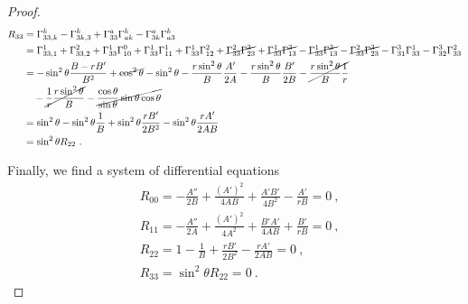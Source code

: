 \begin{proof}
        \begin{equation*}
        \begin{aligned}
            R_{33} & = \Gamma^k_{33,k} - \Gamma^k_{3k,3} + \Gamma^a_{33} \Gamma^k_{ak} - \Gamma^a_{3k} \Gamma^k_{a3} \\ & =\Gamma^1_{33,1} + \Gamma^2_{33,2} + \Gamma^1_{33} \Gamma^0_{10} + \Gamma^1_{33} \Gamma^1_{11} + \Gamma^1_{33} \Gamma^2_{12} + \cancel{\Gamma^2_{33} \Gamma^3_{23}} + \cancel{\Gamma^1_{33} \Gamma^3_{13}} - \cancel{\Gamma^1_{33} \Gamma^3_{13} } - \cancel{\Gamma^2_{33} \Gamma^3_{23}} - \Gamma^3_{31} \Gamma^1_{33} - \Gamma^3_{32} \Gamma^2_{33} \\ & = - \sin^2 \theta \frac{B-rB'}{B^2} + \cancel{\cos^2 \theta} - \sin^2 \theta - \frac{r \sin^2 \theta}{B} \frac{A'}{2A} - \frac{r \sin^2 \theta}{B} \frac{B'}{2B} - \cancel{\frac{r \sin^2 \theta}{B} \frac{1}{r}} \\ & \quad - \cancel{\frac{1}{r} \frac{r \sin^2 \theta}{B}} - \cancel{\frac{\cos \theta}{\sin \theta} \sin \theta \cos \theta} \\ & = \sin^2 \theta - \sin^2 \theta \frac{1}{B} + \sin^2 \theta \frac{rB'}{2B^2} - \sin^2 \theta \frac{rA'}{2AB} \\ & = \sin^2 \theta R_{22} ~.
        \end{aligned}
        \end{equation*}

        Finally, we find a system of differential equations 
        \begin{equation*}
        \begin{aligned}
            & R_{00} = - \frac{A''}{2B} + \frac{(A')^2}{4 AB} + \frac{A'B'}{4B^2} - \frac{A'}{rB}  = 0 ~,
            \\ & R_{11} = - \frac{A''}{2A} + \frac{(A')^2}{4A^2} + \frac{B'A'}{4AB} + \frac{B'}{rB} = 0 ~,
            \\ & R_{22} = 1 - \frac{1}{B} + \frac{rB'}{2B^2} - \frac{rA'}{2AB} = 0 ~,
            \\ & R_{33} = \sin^2 \theta R_{22} = 0 ~.
        \end{aligned}
        \end{equation*}


\end{proof}
